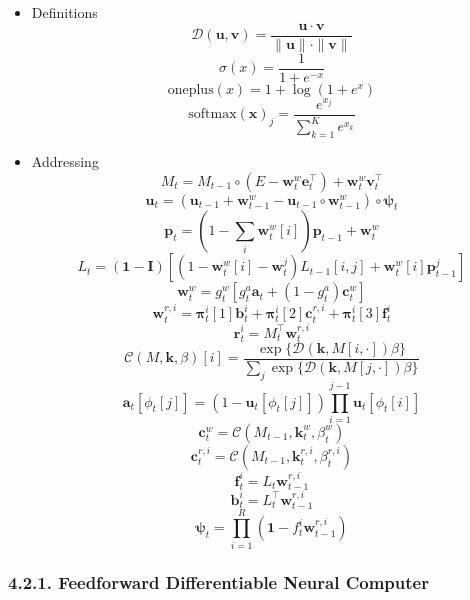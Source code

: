 \documentclass[
]{article}
\begin{document}
\begin{itemize}
\item
  Definitions
  \[{\displaystyle {\mathcal{D}}(\mathbf{u},\mathbf{v})={\frac{\mathbf{u} \cdot \mathbf{v}}{\|\mathbf{u} \| \cdot \| \mathbf{v} \|}}}\]
  \[{\displaystyle \sigma(x)=\frac{1}{1+e^{-x}}}\]
  \[{\displaystyle {\text{oneplus}}(x)=1+\log(1+e^{x})}\]
  \[{\displaystyle {\text{softmax}}(\mathbf{x})_{j}={\frac{e^{x_{j}}}{\sum_{k=1}^{K}e^{x_{k}}}}}\]
\item
  Addressing
  \[{\displaystyle M_{t}=M_{t-1}\circ (E-\mathbf{w}_{t}^{w}\mathbf{e}_{t}^{\intercal})+\mathbf{w}_{t}^{w}\mathbf{v}_{t}^{\intercal}}\]
  \[{\displaystyle \mathbf{u}_{t}=(\mathbf{u}_{t-1}+\mathbf{w}_{t-1}^{w}-\mathbf{u}_{t-1}\circ \mathbf{w}_{t-1}^{w})\circ{\boldsymbol{\psi}}_{t}}\]
  \[{\displaystyle \mathbf{p}_{t}=\left(1-\sum_{i}\mathbf{w}_{t}^{w}[i]\right)\mathbf{p}_{t-1}+\mathbf{w}_{t}^{w}}\]
  \[{\displaystyle L_{t}=(\mathbf{1}-\mathbf{I})\left[(1-\mathbf{w}_{t}^{w}[i]-\mathbf{w}_{t}^{j})L_{t-1}[i,j]+\mathbf{w}_{t}^{w}[i]\mathbf{p}_{t-1}^{j}\right]}\]
  \[{\displaystyle \mathbf{w}_{t}^{w}=g_{t}^{w}[g_{t}^{a}\mathbf{a}_{t}+(1-g_{t}^{a})\mathbf{c}_{t}^{w}]}\]
  \[{\displaystyle \mathbf{w}_{t}^{r,i}={\boldsymbol{\pi}}_{t}^{i}[1]\mathbf{b}_{t}^{i}+{\boldsymbol{\pi}}_{t}^{i}[2]\mathbf{c}_{t}^{r,i}+{\boldsymbol{\pi}}_{t}^{i}[3]\mathbf{f}_{t}^{i}}\]
  \[{\displaystyle \mathbf{r}_{t}^{i}=M_{t}^{\intercal}\mathbf{w}_{t}^{r,i}}\]
  \[{\displaystyle {\mathcal{C}}(M,\mathbf{k},\beta)[i]={\frac{\exp\{{\mathcal{D}}(\mathbf{k},M[i,\cdot])\beta \}}{\sum_{j}\exp\{{\mathcal{D}}(\mathbf{k},M[j,\cdot])\beta \}}}}\]
  \[{\displaystyle \mathbf{a}_{t}[\phi_{t}[j]]=(1-\mathbf{u}_{t}[\phi_{t}[j]])\prod_{i=1}^{j-1}\mathbf{u}_{t}[\phi_{t}[i]]}\]
  \[{\displaystyle \mathbf{c}_{t}^{w}={\mathcal{C}}(M_{t-1},\mathbf{k}_{t}^{w},\beta_{t}^{w})}\]
  \[{\displaystyle \mathbf{c}_{t}^{r,i}={\mathcal{C}}(M_{t-1},\mathbf{k}_{t}^{r,i},\beta_{t}^{r,i})}\]
  \[{\displaystyle \mathbf{f}_{t}^{i}=L_{t}\mathbf{w}_{t-1}^{r,i}}\]
  \[{\displaystyle \mathbf{b}_{t}^{i}=L_{t}^{\intercal}\mathbf{w}_{t-1}^{r,i}}\]
  \[{\displaystyle {\boldsymbol{\psi}}_{t}=\prod_{i=1}^{R}\left(\mathbf{1}-f_{t}^{i}\mathbf{w}_{t-1}^{r,i}\right)}\]
\end{itemize}

\hypertarget{feedforward-differentiable-neural-computer}{%
\subsubsection{4.2.1. Feedforward Differentiable Neural
Computer}\label{feedforward-differentiable-neural-computer}}
\end{document}
